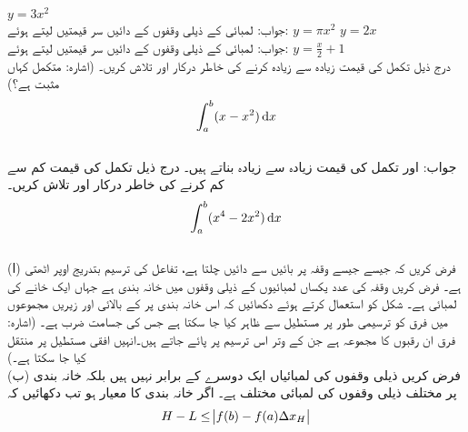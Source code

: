 $y=3x^2$\\
جواب:\quad
{} لمبائی کے  ذیلی وقفوں کے دائیں سر قیمتیں لیتے ہوئے:  
$y=\pi x^2$
$y=2x$\\
جواب:\quad
{} لمبائی کے  ذیلی وقفوں کے دائیں سر قیمتیں لیتے ہوئے: 
$y=\tfrac{x}{2}+1$
\\
درج ذیل تکمل کی قیمت زیادہ سے زیادہ کرنے کی خاطر درکار  اور  تلاش کریں۔ (اشارہ: متکمل کہاں مثبت ہے؟)
\begin{align*}
\int_a^b (x-x^2)\dif x
\end{align*}\\
جواب:\quad
{} اور  تکمل کی قیمت زیادہ سے زیادہ بناتے ہیں۔
درج ذیل تکمل کی قیمت کم سے کم کرنے کی خاطر درکار  اور  تلاش کریں۔
\begin{align*}
\int_a^b (x^4-2x^2)\dif x
\end{align*} 
\\
(ا) \quad
فرض کریں کہ جیسے جیسے   وقفہ  پر بائیں سے دائیں چلتا ہے، تفاعل  کی ترسیم بتدریج اوپر اٹھتی ہے۔ فرض کریں وقفہ  کی  عدد یکساں لمبائیوں کے ذیلی وقفوں میں خانہ بندی  ہے جہاں ایک خانے کی لمبائی  ہے۔ شکل  کو استعمال کرتے ہوئے دکھائیں کہ اس خانہ بندی پر  کے بالائی اور زیریں مجموعوں میں فرق کو ترسیمی طور پر مستطیل  سے ظاہر کیا جا سکتا ہے جس کی جسامت  ضرب  ہے۔ (اشارہ: فرق  ان رقبوں کا مجموعہ ہے جن کے وتر  اس ترسیم پر پائے جاتے ہیں۔انہیں افقی مستطیل  پر منتقل کیا جا سکتا ہے۔)\\
(ب) \quad
فرض کریں ذیلی وقفوں کی لمبائیاں ایک دوسرے کے برابر نہیں ہیں بلکہ خانہ بندی  پر مختلف ذیلی وقفوں کی لمبائی  مختلف ہے۔ اگر  خانہ بندی  کا معیار ہو تب دکھائیں کہ
\begin{align*}
H-L\le \abs{f(b)-f(a)\Delta x_H}
\end{align*}
